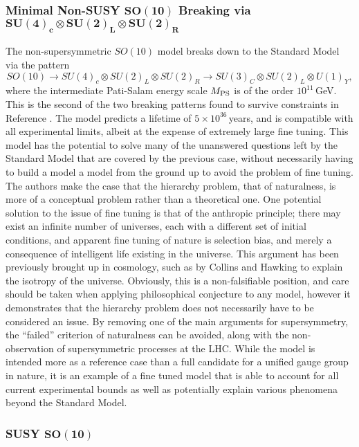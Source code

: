 \documentclass{article}
\begin{document}
\subsubsection{Minimal Non-SUSY $\bm{SO(10)}$ Breaking via $\bm{SU(4)_c \otimes SU(2)_L \otimes SU(2)_R}$}
\label{sec:GUT_SO10_2}
The non-supersymmetric $SO(10)$ model\cite{SO10_2} breaks down to the Standard Model via the pattern
\begin{equation}
SO(10)\rightarrow SU(4)_c \otimes SU(2)_L \otimes SU(2)_R  \rightarrow SU(3)_C\otimes SU(2)_L \otimes U(1)_Y,
\end{equation}
where the intermediate Pati-Salam energy scale $M_{\rm{PS}}$ is of the order $10^{11}\,$GeV. This is the second of the two breaking patterns found to survive constraints in Reference \cite{SO10_UnificationDM}. The model predicts a lifetime of $5\times10^{36}\,$years, and is compatible with all experimental limits, albeit at the expense of extremely large fine tuning. This model has the potential to solve many of the unanswered questions left by the Standard Model that are covered by the previous case, without necessarily having to build a model a model from the ground up to avoid the problem of fine tuning.
The authors make the case that the hierarchy problem, that of naturalness, is more of a conceptual problem rather than a theoretical one. One potential solution to the issue of fine tuning is that of the anthropic principle; there may exist an infinite number of universes, each with a different set of initial conditions, and apparent fine tuning of nature is selection bias, and merely a consequence of intelligent life existing in the universe. This argument has been previously brought up in cosmology, such as by Collins and Hawking \cite{AnthropicPrinciple} to explain the isotropy of the universe. Obviously, this is a non-falsifiable position, and care should be taken when applying philosophical conjecture to any model, however it demonstrates that the hierarchy problem does not necessarily have to be considered an issue. By removing one of the main arguments for supersymmetry, the ``failed'' criterion of naturalness can be avoided, along with the non-observation of supersymmetric processes at the LHC.
While the model is intended more as a reference case than a full candidate for a unified gauge group in nature, it is an example of a fine tuned model that is able to account for all current experimental bounds as well as potentially explain various phenomena beyond the Standard Model.

\subsubsection{SUSY $\bm{SO(10)}$}%
\label{sec:GUT_SO10_3}
\end{document}
